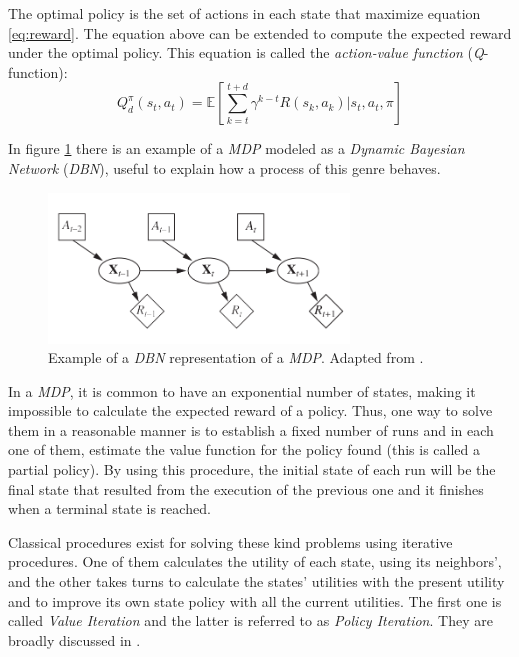 The optimal policy is the set of actions in each state that maximize equation
\ref{eq:reward}. The equation above can be extended to compute the expected
reward under the optimal policy. This equation is called the
\textit{action-value function} (\textit{Q}-function):
\begin{equation}
    \label{eq:qreward}
    Q_d^\pi(s_t,a_t) = \mathbb{E}[\displaystyle\sum_{k=t}^{t+d}
    \gamma^{k-t}R(s_k,a_k)|s_t,a_t,\pi]
\end{equation}

In figure \ref{fig:dbn_mdp} there is an example of a \textit{MDP} modeled as
a \textit{Dynamic Bayesian Network} (\textit{DBN}), useful to explain how a
process of this genre behaves.

\begin{figure}[H]
    \centering
        \includegraphics[width=8cm]{images/mdp-dbn}
        \caption{Example of a \textit{DBN} representation of a
        \textit{MDP}. Adapted from \cite{Russell2009}.
        }
        \label{fig:dbn_mdp}
\end{figure}

In a \textit{MDP}, it is common to have an exponential number of states, making
it impossible to calculate the expected reward of a policy. Thus, one way to
solve them in a reasonable manner is to establish a fixed number of runs and
in each one of them, estimate the value function for the policy found (this is
called a partial policy).
By using this procedure, the initial state of each run will be the final state
that resulted from the execution of the previous one and it finishes when a
terminal state is reached.

Classical procedures exist for solving these kind problems using iterative
procedures. One of them calculates the utility of each state, using its
neighbors', and the other takes turns to calculate the states' utilities with
the present utility and to improve its own state policy with all the current
utilities. The first one is called \textit{Value Iteration} and the latter is
referred to as \textit{Policy Iteration}.
They are broadly discussed in \cite{Russell2009}.

